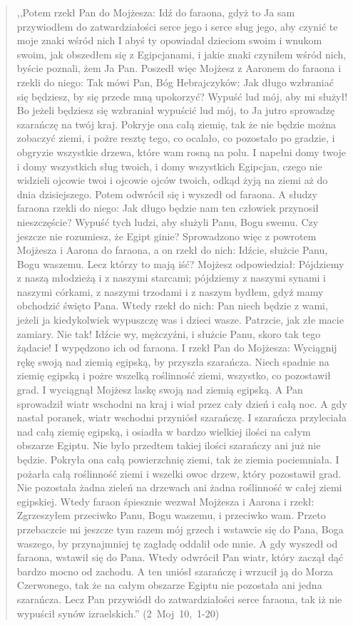 \documentclass[10pt,a4paper,oneside]{article}
\begin{document}
\begin{quote}
,,Potem rzekł Pan do Mojżesza: Idź do faraona, gdyż to Ja sam przywiodłem do zatwardziałości serce jego i serce sług jego, aby czynić te moje znaki wśród nich I abyś ty opowiadał dzieciom swoim i wnukom swoim, jak obszedłem się z Egipcjanami, i jakie znaki czyniłem wśród nich, byście poznali, żem Ja Pan. Poszedł więc Mojżesz z Aaronem do faraona i rzekli do niego: Tak mówi Pan, Bóg Hebrajczyków: Jak długo wzbraniać się będziesz, by się przede mną upokorzyć? Wypuść lud mój, aby mi służył! Bo jeżeli będziesz się wzbraniał wypuścić lud mój, to Ja jutro sprowadzę szarańczę na twój kraj. Pokryje ona całą ziemię, tak że nie będzie można zobaczyć ziemi, i pożre resztę tego, co ocalało, co pozostało po gradzie, i obgryzie wszystkie drzewa, które wam rosną na polu. I napełni domy twoje i domy wszystkich sług twoich, i domy wszystkich Egipcjan, czego nie widzieli ojcowie twoi i ojcowie ojców twoich, odkąd żyją na ziemi aż do dnia dzisiejszego. Potem odwrócił się i wyszedł od faraona. A słudzy faraona rzekli do niego: Jak długo będzie nam ten człowiek przynosił nieszczęście? Wypuść tych ludzi, aby służyli Panu, Bogu swemu. Czy jeszcze nie rozumiesz, że Egipt ginie? Sprowadzono więc z powrotem Mojżesza i Aarona do faraona, a on rzekł do nich: Idźcie, służcie Panu, Bogu waszemu. Lecz którzy to mają iść? Mojżesz odpowiedział: Pójdziemy z naszą młodzieżą i z naszymi starcami; pójdziemy z naszymi synami i naszymi córkami, z naszymi trzodami i z naszym bydłem, gdyż mamy obchodzić święto Pana. Wtedy rzekł do nich: Pan niech będzie z wami, jeżeli ja kiedykolwiek wypuszczę was i dzieci wasze. Patrzcie, jak złe macie zamiary. Nie tak! Idźcie wy, mężczyźni, i służcie Panu, skoro tak tego żądacie! I wypędzono ich od faraona. I rzekł Pan do Mojżesza: Wyciągnij rękę swoją nad ziemią egipską, by przyszła szarańcza. Niech spadnie na ziemię egipską i pożre wszelką roślinność ziemi, wszystko, co pozostawił grad. I wyciągnął Mojżesz laskę swoją nad ziemią egipską. A Pan sprowadził wiatr wschodni na kraj i wiał przez cały dzień i całą noc. A gdy nastał poranek, wiatr wschodni przyniósł szarańczę. I szarańcza przyleciała nad całą ziemię egipską, i osiadła w bardzo wielkiej ilości na całym obszarze Egiptu. Nie było przedtem takiej ilości szarańczy ani już nie będzie. Pokryła ona całą powierzchnię ziemi, tak że ziemia pociemniała. I pożarła całą roślinność ziemi i wszelki owoc drzew, który pozostawił grad. Nie pozostała żadna zieleń na drzewach ani żadna roślinność w całej ziemi egipskiej. Wtedy faraon śpiesznie wezwał Mojżesza i Aarona i rzekł: Zgrzeszyłem przeciwko Panu, Bogu waszemu, i przeciwko wam. Przeto przebaczcie mi jeszcze tym razem mój grzech i wstawcie się do Pana, Boga waszego, by przynajmniej tę zagładę oddalił ode mnie. A gdy wyszedł od faraona, wstawił się do Pana. Wtedy odwrócił Pan wiatr, który zaczął dąć bardzo mocno od zachodu. A ten uniósł szarańczę i wrzucił ją do Morza Czerwonego, tak że na całym obszarze Egiptu nie pozostała ani jedna szarańcza. Lecz Pan przywiódł do zatwardziałości serce faraona, tak iż nie wypuścił synów izraelskich.'' \mbox{(2 Moj 10, 1-20)}
\end{quote}
\end{document}
